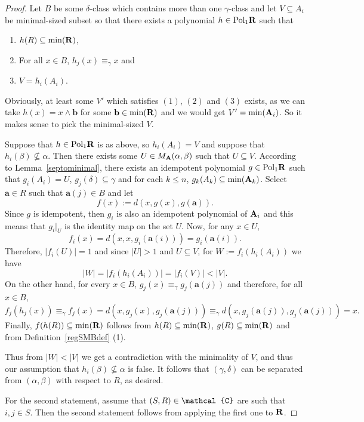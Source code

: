 \documentclass[11pt]{amsart}
\newcommand{\m}[1]{{\uppercase {\mathbf {#1}}}}
\newcommand{\vr}[1]{{\uppercase {\mathcal{#1}}}}
\newcommand{\poln}[2]{{\rm Pol_{#1}\m #2}}
\newcommand{\mt}{\wedge}
\theoremstyle{definition}
\begin{document}
\begin{proof}
Let $B$ be some $\delta$-class which contains more than one $\gamma$-class and let $V\subseteq A_i$ be minimal-sized subset so that there exists a polynomial $h\in\poln{1}{R}$ such that
\begin{enumerate}
\item $h(R)\subseteq\mathrm{min}(\m r)$,
\item For all $x\in B$, $h_j(x)\equiv_\gamma x$ and
\item $V=h_i(A_i)$.
\end{enumerate}
Obviously, at least some $V'$ which satisfies $(1)$, $(2)$ and $(3)$ exists, as we can take $h(x)=x\mt \mathbf{b}$ for some $\mathbf{b}\in \mathrm{min}(\m r)$ and we would get $V'=\mathrm{min}(\m a_i)$. So it makes sense to pick the minimal-sized $V$.

Suppose that $h\in\poln{1}{r}$ is as above, so $h_i(A_i)=V$ and suppose that $h_i(\beta)\nsubseteq\alpha$. Then there exists some $U\in M_{\m a}(\alpha,\beta)$ such that $U\subseteq V$. According to Lemma~\ref{septominimal}, there exists an idempotent polynomial $g\in\poln{1}{r}$ such that $g_i(A_i)=U$, $g_j(\delta)\subseteq\gamma$ and for each $k\leq n$, $g_k(A_k)\subseteq \mathrm{min}(\m a_k)$. Select $\mathbf{a}\in R$ such that $\mathbf{a}(j)\in B$ and let 
$$f(x):=d(x,g(x),g(\mathbf{a})).$$
Since $g$ is idempotent, then $g_i$ is also an idempotent polynomial of $\m a_i$ and this means that $g_i|_U$ is the identity map on the set $U$. Now, for any $x\in U$, 
$$f_i(x)=d(x,x,g_i(\mathbf{a}(i)))=g_i(\mathbf{a}(i)).$$
Therefore, $|f_i(U)|=1$ and since $|U|>1$ and $U\subseteq V$, for $W:=f_i(h_i(A_i))$ we have
$$|W|=|f_i(h_i(A_i))|=|f_i(V)|<|V|.$$ 
On the other hand, for every $x\in B$, $g_j(x)\equiv_\gamma g_j(\mathbf{a}(j))$ and therefore, for all $x\in B$, 
$$f_j(h_j(x))\equiv_\gamma f_j(x)=d(x,g_j(x),g_j(\mathbf{a}(j)))\equiv_\gamma d(x,g_j(\mathbf{a}(j)),g_j(\mathbf{a}(j)))=x.$$
Finally, $f(h(R))\subseteq \mathrm{min}(\m r)$ follows from $h(R)\subseteq \mathrm{min}(\m r)$, $g(R)\subseteq \mathrm{min}(\m r)$ and from Definition~\ref{regSMBdef} (1).

Thus from $|W|<|V|$ we get a contradiction with the minimality of $V$, and thus our assumption that $h_i(\beta)\nsubseteq\alpha$ is false. It follows that $(\gamma,\delta)$ can be separated from $(\alpha,\beta)$ with respect to $R$, as desired.

For the second statement, assume that $(S,R)\in \vr c$ are such that $i,j\in S$. Then the second statement follows from applying the first one to $\m r$.
\end{proof}
\end{document}
